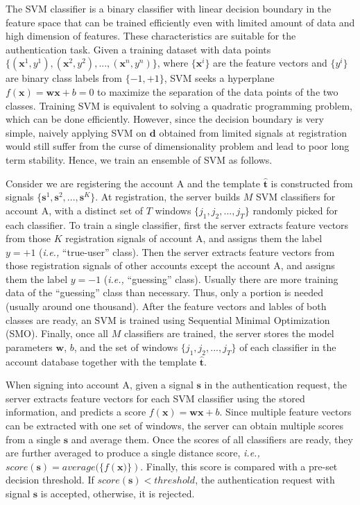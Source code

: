 \documentclass[conference]{IEEEtran}
\begin{document}
The SVM classifier is a binary classifier with linear decision boundary in the feature space that can be trained efficiently even with limited amount of data and high dimension of features. These characteristics are suitable for the authentication task. Given a training dataset with data points $\{(\mathbf{x}^1, y^1), (\mathbf{x}^2, y^2), ..., (\mathbf{x}^n, y^n)\}$, where $\{\mathbf{x}^i\}$ are the feature vectors and $\{y^i\}$ are binary class labels from $\{-1, +1\}$, SVM seeks a hyperplane $f(\mathbf{x}) = \mathbf{w} \mathbf{x} + b = 0$ to maximize the separation of the data points of the two classes. Training SVM is equivalent to solving a quadratic programming problem, which can be done efficiently. However, since the decision boundary is very simple, naively applying SVM on $\mathbf{d}$ obtained from limited signals at registration would still suffer from the curse of dimensionality problem and lead to poor long term stability. Hence, we train an ensemble of SVM as follows.


Consider we are registering the account A and the template $\hat{\mathbf{t}}$ is constructed from signals $\{\mathbf{s}^1, \mathbf{s}^2, ..., \mathbf{s}^K\}$. At registration, the server builds $M$ SVM classifiers for account A, with a distinct set of $T$ windows $\{j_1, j_2, ..., j_T\}$ randomly picked for each classifier. To train a single classifier, first the server extracts feature vectors from those $K$ registration signals of account A, and assigns them the label $y = +1$ (\textit{i.e.,} ``true-user'' class). Then the server extracts feature vectors from those registration signals of other accounts except the account A, and assigns them the label $y = -1$ (\textit{i.e.,} ``guessing'' class). Usually there are more training data of the ``guessing'' class than necessary. Thus, only a portion is needed (usually around one thousand). After the feature vectors and lables of both classes are ready, an SVM is trained using Sequential Minimal Optimization (SMO). Finally, once all $M$ classifiers are trained, the server stores the model parameters $\mathbf{w}$, $b$, and the set of windows $\{j_1, j_2, ..., j_T\}$ of each classifier in the account database together with the template $\hat{\mathbf{t}}$.

When signing into account A, given a signal $\mathbf{s}$ in the authentication request, the server extracts feature vectors for each SVM classifier using the stored information, and predicts a score $f(\mathbf{x}) = \mathbf{w} \mathbf{x} + b$. Since multiple feature vectors can be extracted with one set of windows, the server can obtain multiple scores from a single $\mathbf{s}$ and average them. Once the scores of all classifiers are ready, they are further averaged to produce a single distance score, \textit{i.e.,} $score(\mathbf{s}) = average(\{f(\mathbf{x)}\})$. Finally, this score is compared with a pre-set decision threshold. If $score(\mathbf{s}) < threshold$, the authentication request with signal $\mathbf{s}$ is accepted, otherwise, it is rejected.
\end{document}
